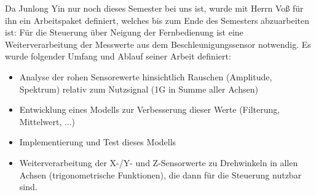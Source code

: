 Da Junlong Yin nur noch dieses Semester bei uns ist, wurde mit Herrn Voß für ihn ein Arbeitspaket definiert, welches bis zum Ende des Semesters abzuarbeiten ist: Für die Steuerung über Neigung der Fernbedienung ist eine Weiterverarbeitung der Messwerte aus dem Beschleunigungssensor notwendig. Es wurde folgender Umfang und Ablauf seiner Arbeit definiert:
\begin{itemize}
	\item Analyse der rohen Sensorewerte hinsichtlich Rauschen (Amplitude, Spektrum) relativ zum Nutzsignal (1G in Summe aller Achsen)
	\item Entwicklung eines Modells zur Verbesserung dieser Werte (Filterung, Mittelwert, ...)
	\item Implementierung und Test dieses Modells
	\item Weiterverarbeitung der X-/Y- und Z-Sensorwerte zu Drehwinkeln in allen Achsen (trigonometrische Funktionen), die dann für die Steuerung nutzbar sind.
\end{itemize}